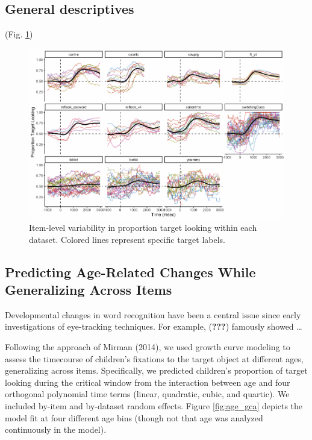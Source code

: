 \documentclass[10pt, letterpaper]{article}
\newenvironment{CodeChunk}{}{}
\begin{document}
\hypertarget{general-descriptives}{%
\subsection{General descriptives}\label{general-descriptives}}

(Fig. \ref{fig:peekbank_item_vis})

\begin{CodeChunk}
\begin{figure}[h]

{\centering \includegraphics{figs/peekbank_item_vis-1} 

}

\caption[Item-level variability in proportion target looking within each dataset]{Item-level variability in proportion target looking within each dataset. Colored lines represent specific target labels.}\label{fig:peekbank_item_vis}
\end{figure}
\end{CodeChunk}

\hypertarget{predicting-age-related-changes-while-generalizing-across-items}{%
\subsection{Predicting Age-Related Changes While Generalizing Across
Items}\label{predicting-age-related-changes-while-generalizing-across-items}}

Developmental changes in word recognition have been a central issue
since early investigations of eye-tracking techniques. For example,
({\textbf{???}}) famously showed \ldots{}

Following the approach of Mirman (2014), we used growth curve modeling
to assess the timecourse of children's fixations to the target object at
different ages, generalizing across items. Specifically, we predicted
children's proportion of target looking during the critical window from
the interaction between age and four orthogonal polynomial time terms
(linear, quadratic, cubic, and quartic). We included by-item and
by-dataset random effects. Figure \ref{fig:age_gca} depicts the model
fit at four different age bins (though not that age was analyzed
continuously in the model).
\end{document}
